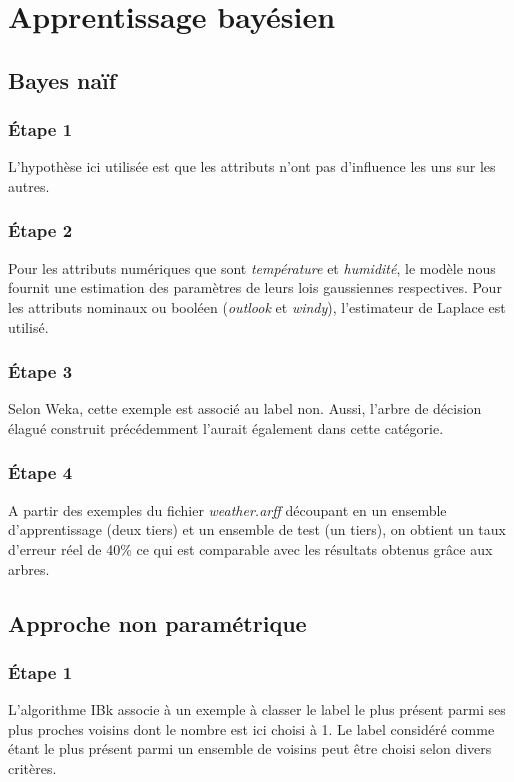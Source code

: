 \documentclass[a4paper,12pt]{article}
\begin{document}
\section{Apprentissage bayésien}


\subsection{Bayes naïf}

\subsubsection*{\'Etape 1}
L'hypothèse ici utilisée est que les attributs n'ont pas d'influence les uns sur les autres.

\subsubsection*{\'Etape 2}
Pour les attributs numériques que sont \textit{température} et \textit{humidité}, le modèle nous fournit une estimation des paramètres de leurs lois gaussiennes respectives. Pour les attributs nominaux ou booléen (\textit{outlook} et \textit{windy}), l'estimateur de Laplace est utilisé.

\subsubsection*{\'Etape 3}
Selon Weka, cette exemple est associé au label non. Aussi, l'arbre de décision élagué construit précédemment l'aurait également dans cette catégorie.

\subsubsection*{\'Etape 4}
A partir des exemples du fichier \textit{weather.arff} découpant en un ensemble d'apprentissage (deux tiers) et un ensemble de test (un tiers), on obtient un taux d'erreur réel de 40\% ce qui est comparable avec les résultats obtenus grâce aux arbres. 

\subsection{Approche non paramétrique}

\subsubsection*{\'Etape 1}
L'algorithme IBk associe à un exemple à classer le label le plus présent parmi ses plus proches voisins dont le nombre est ici choisi à 1. Le label considéré comme étant le plus présent parmi un ensemble de voisins peut être choisi selon divers critères. 
\end{document}
